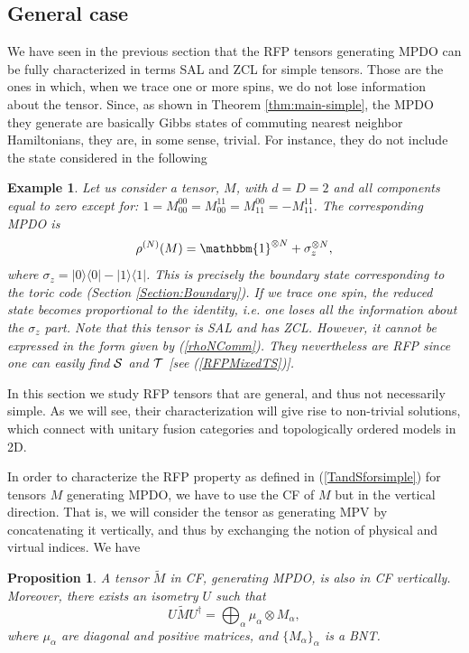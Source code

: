 \documentclass{elsarticle}
\newcommand{\Id}{\mathbbm{1}}
\newcommand{\be}{\begin{equation}}
\newcommand{\ee}{\end{equation}}
\newtheorem{prop}[thm]{Proposition}
\newtheorem{ex}[thm]{Example}
\begin{document}
\subsection{General case}

We have seen in the previous section that the RFP tensors generating MPDO can be fully characterized in terms SAL and ZCL for simple tensors. Those are the ones in which, when we trace one or more spins, we do not lose information about the tensor. Since, as shown in Theorem \ref{thm:main-simple}, the MPDO they generate are basically Gibbs states of commuting nearest neighbor Hamiltonians, they are, in some sense, trivial. For instance, they do not include the state considered in the following

\begin{ex}
    Let us consider a tensor, $M$, with $d=D=2$ and all components equal to zero except for: $1=M_{00}^{00}=M_{00}^{11}=M_{11}^{00}=-M_{11}^{11}$. The corresponding MPDO is
    \be
        \rho^{(N)}(M)= \Id^{\otimes N} + \sigma_z^{\otimes N},
    \ee
    where $\sigma_z=|0\rangle\langle 0| - |1\rangle\langle 1|$. This is precisely the boundary state corresponding to the toric code \cite{Toric,bulkboundconj} (Section \ref{Section:Boundary}). If we trace one spin, the reduced state becomes proportional to the identity, i.e. one loses all the information about the $\sigma_z$ part. Note that this tensor is SAL and has ZCL. However, it cannot be expressed in the form given by (\ref{rhoNComm}).
    They nevertheless are RFP since one can easily find ${\cal S}$ and ${\cal T}$ [see (\ref{RFPMixedTS})].
\end{ex}

In this section we study RFP tensors that are general, and thus not necessarily simple. As we will see, their characterization will give rise to non-trivial solutions, which connect with unitary fusion categories and topologically ordered models in 2D.

In order to characterize the RFP property as defined in  (\ref{TandSforsimple}) for  tensors $M$ generating MPDO,  we have to use the CF of $M$ but in the vertical direction. That is, we will consider the tensor as generating MPV by concatenating it vertically, and thus by exchanging the notion of physical and virtual indices. We have

\begin{prop}\label{Prop:IV.12}
    A tensor $\tilde M$ in CF, generating MPDO, is also in CF vertically. Moreover, there exists an isometry $U$ such that
    \be
        \label{UMU}
        U \tilde M U^\dagger = \bigoplus_\alpha \mu_\alpha \otimes M_\alpha,
    \ee
    where $\mu_\alpha$ are diagonal and positive matrices, and $\{M_\alpha\}_\alpha$ is a BNT.
\end{prop}
\end{document}

